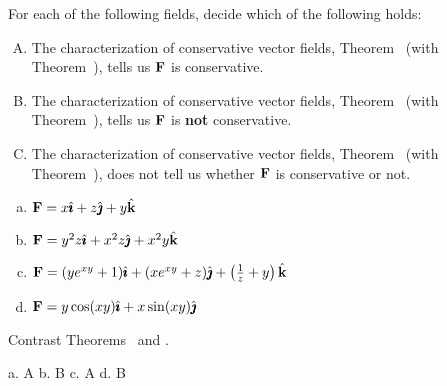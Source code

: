 \begin{question}
For each of the following fields, decide which of the following holds:
\begin{enumerate}[A.]
\item The characterization of conservative vector fields, Theorem~ (with Theorem~),  tells us $\mathbf{F}$ is conservative.
\item The characterization of conservative vector fields, Theorem~ (with Theorem~), tells us $\mathbf{F}$ is \textbf{not} conservative.
\item The characterization of conservative vector fields, Theorem~ (with Theorem~), does not tell us whether $\mathbf{F}$ is conservative or not.
\end{enumerate}

\begin{enumerate}[a.]
\item $\mathbf{F}=x\hat{\pmb{\imath}} + z\hat{\pmb{\jmath}} + y\hat{\mathbf{k}}$
\item $\mathbf{F}=y^2z\hat{\pmb{\imath}} + x^2z\hat{\pmb{\jmath}} + x^2y\hat{\mathbf{k}}$
\item $\mathbf{F}=(ye^{xy}+1)\hat{\pmb{\imath}} + (xe^{xy}+z)\hat{\pmb{\jmath}} + \left( \frac1z+y\right)\hat{\mathbf{k}}$
\item $\mathbf{F}=y\cos(xy)\hat{\pmb{\imath}} + x\sin(xy)\hat{\pmb{\jmath}} $
\end{enumerate}
\end{question}
\begin{hint}
Contrast Theorems~ and .
\end{hint}
\begin{answer}
a.  A\qquad
b.  B \qquad
c.  A \qquad
d.  B
\end{answer}
